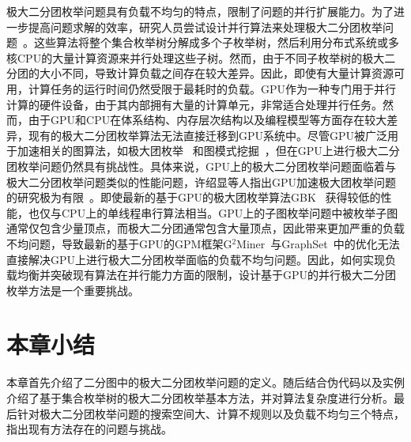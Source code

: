 极大二分团枚举问题具有负载不均匀的特点，限制了问题的并行扩展能力。为了进一步提高问题求解的效率，研究人员尝试设计并行算法来处理极大二分团枚举问题~\cite{mapreduceMBE16, MBEHe18, parMBE18}。这些算法将整个集合枚举树分解成多个子枚举树，然后利用分布式系统或多核CPU的大量计算资源来并行处理这些子树。然而，由于不同子枚举树的极大二分团的大小不同，导致计算负载之间存在较大差异。因此，即使有大量计算资源可用，计算任务的运行时间仍然受限于最耗时的负载。GPU作为一种专门用于并行计算的硬件设备，由于其内部拥有大量的计算单元，非常适合处理并行任务。然而，由于GPU和CPU在体系结构、内存层次结构以及编程模型等方面存在较大差异，现有的极大二分团枚举算法无法直接迁移到GPU系统中。尽管GPU被广泛用于加速相关的图算法，如极大团枚举~\cite{MCEGPUBitset13,MCEGPUdpp17,MCE-GPU21} 和图模式挖掘~\cite{g2miner22,SubgraphGpu22,Kclique22,stmatch22}，但在GPU上进行极大二分团枚举问题仍然具有挑战性。具体来说，GPU上的极大二分团枚举问题面临着与极大二分团枚举问题类似的性能问题，许绍显等人指出GPU加速极大团枚举问题的研究极为有限~\cite{MCEreview22}。即使最新的基于GPU的极大团枚举算法GBK~\cite{MCE-GPU21} 获得较低的性能，也仅与CPU上的单线程串行算法相当。GPU上的子图枚举问题中被枚举子图通常仅包含少量顶点，而极大二分团通常包含大量顶点，因此带来更加严重的负载不均问题，导致最新的基于GPU的GPM框架G$^2$Miner~\cite{g2miner22}与GraphSet~\cite{Graphset23}中的优化无法直接解决GPU上进行极大二分团枚举面临的负载不均匀问题。因此，如何实现负载均衡并突破现有算法在并行能力方面的限制，设计基于GPU的并行极大二分团枚举方法是一个重要挑战。



\section{本章小结}

本章首先介绍了二分图中的极大二分团枚举问题的定义。随后结合伪代码以及实例介绍了基于集合枚举树的极大二分团枚举基本方法，并对算法复杂度进行分析。最后针对极大二分团枚举问题的搜索空间大、计算不规则以及负载不均匀三个特点，指出现有方法存在的问题与挑战。
